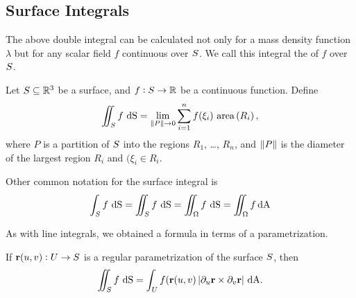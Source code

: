   \subsection{Surface Integrals}
 The above double integral can be calculated not only for a mass density
function $\lambda $ but for any scalar field $f$ continuous over $S$. We
call this integral the  of $f$ over $S$.
  \begin{definition}
    Let $S \subseteq \mathbb{R}^3$ be a surface, and $f:S \to \mathbb{R}$ be a continuous function.
    Define
    \begin{equation*}
      \diint_\superficie f \,   \d \S= \lim_{\norm{P} \to 0} \sum_{i = 1}^n f(\xi_i) \area{R_i},
    \end{equation*}
    where $P$ is a partition of $S$ into the regions $R_1$, \dots, $R_n$, and ${\left\|P\right\|}$ is the diameter of the largest region $R_i$ and $(\xi_i \in R_i$.
  \end{definition}

  \begin{remark}
    Other common notation for the surface integral is
    \begin{equation*}
      \dint_\superficie f \,  \d \S
	= \diint_\superficie f \,   \d \S
	= \diint_\Omega f \, \d \S
	= \diint_\Omega f \, \dA
    \end{equation*}
  \end{remark}

  As with line integrals, we obtained a formula in terms of a parametrization.


  \begin{proposition}\label{ppnSintScalar}
    If $\mathbf{ r}(u,v):U \to S$ is a regular parametrization of the surface $S$, then
    \begin{equation*}
      \diint_\superficie f \,  \d \S
	= \dint_U f(\vector{r}(u,v) \, \abs{\partial_u \vector{r} \times \partial_v \vector{r}} \, \dA.
    \end{equation*}
  \end{proposition}

